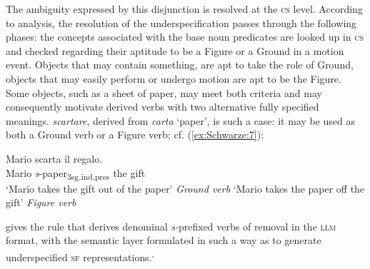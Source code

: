 \documentclass[output=paper]{langsci/langscibook}
\begin{document}
The ambiguity expressed by this disjunction is resolved at the \textsc{cs} level.
According to %
%
analysis, the resolution of the underspecification passes through the following phases: the concepts associated with the base noun predicates are looked up in \textsc{cs} and checked regarding their aptitude to be a Figure or a Ground in a motion event. Objects that may contain something, are apt to take the role of Ground, objects that may easily perform or undergo motion are apt to be the Figure. Some objects, such as a sheet of paper, may meet both criteria and may consequently motivate derived verbs with two alternative fully specified meanings.  \emph{scartare}, derived from \emph{carta} `paper', is such a case: it may be used as both a Ground verb or a Figure verb; cf. (\ref{ex:Schwarze:7}):

\ea\label{ex:Schwarze:7} \gll Mario scarta il regalo.\\
Mario \emph{s}-paper\textsubscript{3sg.ind.pres} the gift\\
\glt `Mario takes the gift out of the paper' \hfill \emph{Ground verb}
\glt `Mario takes the paper off the gift' \hfill \emph{Figure verb}
\z

 gives the rule that derives denominal \emph{s-}prefixed verbs of removal in the \textsc{llm} format, with the semantic layer formulated in such a way as to generate underspecified \textsc{sf} representations.\textsuperscript{,}
\end{document}
